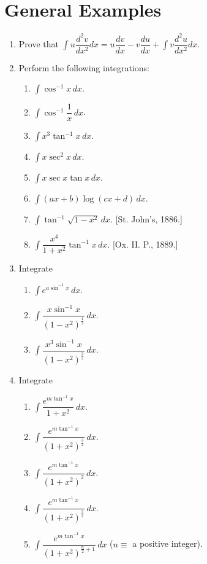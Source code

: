 \documentclass[11pt, a4paper]{article}
\newcommand{\source}[1]{\hfill\textnormal{[#1]}}
\begin{document}
\section*{General Examples}

\begin{enumerate}[leftmargin=2em]

\item Prove that $\displaystyle\int u\dfrac{d^2v}{dx^2}dx = u\dfrac{dv}{dx}-v\dfrac{du}{dx}+\int v\dfrac{d^2u}{dx^2}dx$.

\item Perform the following integrations:
\begin{enumerate}[label=(\roman*)]
\item $\displaystyle\int \cos^{-1}x\,dx$.
\item $\displaystyle\int \cos^{-1}\dfrac{1}{x}\,dx$.
\item $\displaystyle\int x^3\tan^{-1}x\,dx$.
\item $\displaystyle\int x\sec^2x\,dx$.
\item $\displaystyle\int x\sec x\tan x\,dx$.
\item $\displaystyle\int (ax+b)\log(cx+d)\,dx$.
\item $\displaystyle\int \tan^{-1}\sqrt{1-x^2}\,dx$. \source{St. John's, 1886.}
\item $\displaystyle\int \dfrac{x^4}{1+x^2}\tan^{-1}x\,dx$. \source{Ox. II. P., 1889.}
\end{enumerate}

\item Integrate
\begin{enumerate}[label=(\roman*)]
\item $\displaystyle\int e^{a\sin^{-1}x}\,dx$.
\item $\displaystyle\int \dfrac{x\sin^{-1}x}{(1-x^2)^{\frac12}}\,dx$.
\item $\displaystyle\int \dfrac{x^3\sin^{-1}x}{(1-x^2)^{\frac32}}\,dx$.
\end{enumerate}

\item Integrate
\begin{enumerate}[label=(\roman*)]
\item $\displaystyle\int \dfrac{e^{m\tan^{-1}x}}{1+x^2}\,dx$.
\item $\displaystyle\int \dfrac{e^{m\tan^{-1}x}}{(1+x^2)^{\frac32}}\,dx$.
\item $\displaystyle\int \dfrac{e^{m\tan^{-1}x}}{(1+x^2)^2}\,dx$.
\item $\displaystyle\int \dfrac{e^{m\tan^{-1}x}}{(1+x^2)^{\frac52}}\,dx$.
\item $\displaystyle\int \dfrac{e^{m\tan^{-1}x}}{(1+x^2)^{\frac{n}{2}+1}}\,dx$ ($n\equiv$ a positive integer).
\end{enumerate}


\end{enumerate}
\end{document}
